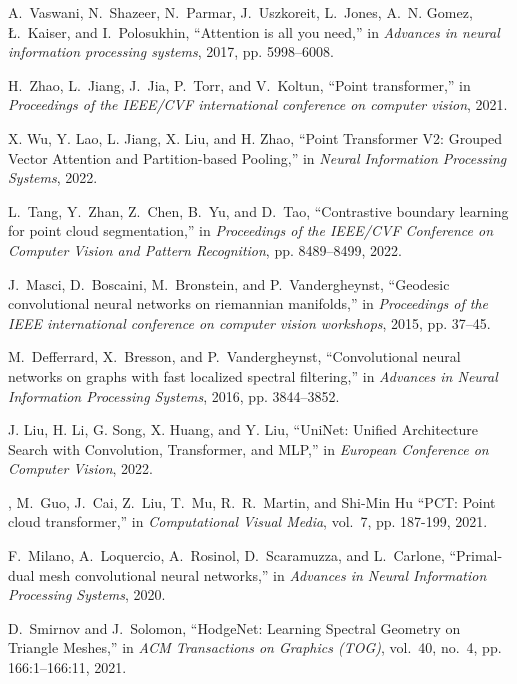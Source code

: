 \begin{thebibliography}{1}
A.~Vaswani, N.~Shazeer, N.~Parmar, J.~Uszkoreit, L.~Jones, A.~N. Gomez,
  {\L}.~Kaiser, and I.~Polosukhin, ``Attention is all you need,'' in
  \emph{Advances in neural information processing systems}, 2017, pp.
  5998--6008.

H.~Zhao, L.~Jiang, J.~Jia, P.~Torr, and V.~Koltun, ``Point transformer,'' in \emph{Proceedings of the IEEE/CVF international conference on
  computer vision}, 2021.

X. Wu, Y. Lao, L. Jiang, X. Liu, and H. Zhao, ``Point Transformer V2: Grouped Vector Attention and Partition-based Pooling,'' in \emph{Neural Information Processing Systems}, 2022.

L.~Tang, Y.~Zhan, Z.~Chen, B.~Yu, and D.~Tao, ``Contrastive boundary learning for point cloud segmentation,'' in \emph{Proceedings of the IEEE/CVF Conference on Computer Vision and Pattern Recognition},
pp. 8489--8499, 2022.

J.~Masci, D.~Boscaini, M.~Bronstein, and P.~Vandergheynst, ``Geodesic
  convolutional neural networks on riemannian manifolds,'' in \emph{Proceedings
  of the IEEE international conference on computer vision workshops}, 2015, pp.
  37--45.

M.~Defferrard, X.~Bresson, and P.~Vandergheynst, ``Convolutional neural
  networks on graphs with fast localized spectral filtering,'' in
  \emph{Advances in Neural Information Processing Systems}, 2016, pp.
  3844--3852.

J. Liu, H. Li, G. Song, X. Huang, and Y. Liu,
``UniNet: Unified Architecture Search with Convolution, Transformer, and MLP,'' in
\emph{European Conference on Computer Vision}, 2022.

,
M.~Guo, J.~Cai, Z.~Liu, T.~Mu, R.~R.~Martin, and Shi-Min Hu
``{PCT}: Point cloud transformer,'' in \emph {Computational Visual Media}, vol.~7, pp. 187-199, 2021.

F.~Milano, A.~Loquercio, A.~Rosinol, D.~Scaramuzza, and L.~Carlone,
  ``Primal-dual mesh convolutional neural networks,'' in \emph{Advances in
  Neural Information Processing Systems}, 2020.

D.~Smirnov and J.~Solomon, 
  ``{HodgeNet}: Learning Spectral Geometry on Triangle Meshes,'' in \emph{ACM Transactions on Graphics (TOG)}, vol.~40, no.~4, pp. 166:1--166:11, 2021.


\end{thebibliography}
